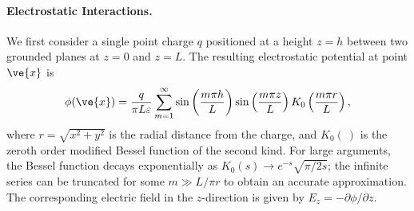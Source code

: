 \paragraph{Electrostatic Interactions.}
We first consider a single point charge $q$ positioned at a height $z=h$ between two grounded planes at $z=0$ and $z=L$.  The resulting electrostatic potential at point $\ve{x}$ is 
\begin{equation}
    \phi(\ve{x}) = \frac{q}{\pi L \varepsilon} \sum_{m=1}^{\infty} \sin\left(\frac{m\pi h}{L}\right)  \sin\left(\frac{m\pi z}{L}\right) K_0\left(\frac{m \pi r}{L}\right),\label{eq:point}
\end{equation}
where $r=\sqrt{x^2 + y^2}$ is the radial distance from the charge, and $K_0(~)$ is the zeroth order modified Bessel function of the second kind. For large arguments, the Bessel function decays exponentially as $K_0(s)\rightarrow e^{-s}\sqrt{\pi/2 s} $; the infinite series can be truncated for some $m\gg L/\pi r$ to obtain an accurate approximation.  The corresponding electric field in the $z$-direction is given by $E_z = -\partial \phi / \partial z$. 

